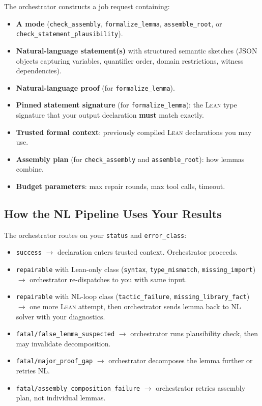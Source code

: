 \documentclass[11pt,a4paper]{article}
\newcommand{\Lean}{\textsc{Lean}}
\begin{document}
The orchestrator constructs a job request containing:

\begin{itemize}[leftmargin=2em]
  \item \textbf{A mode} (\texttt{check\_assembly}, \texttt{formalize\_lemma}, \texttt{assemble\_root}, or \texttt{check\_statement\_plausibility}).
  \item \textbf{Natural-language statement(s)} with structured semantic sketches (JSON objects capturing variables, quantifier order, domain restrictions, witness dependencies).
  \item \textbf{Natural-language proof} (for \texttt{formalize\_lemma}).
  \item \textbf{Pinned statement signature} (for \texttt{formalize\_lemma}): the \Lean{} type signature that your output declaration \textbf{must} match exactly.
  \item \textbf{Trusted formal context}: previously compiled \Lean{} declarations you may use.
  \item \textbf{Assembly plan} (for \texttt{check\_assembly} and \texttt{assemble\_root}): how lemmas combine.
  \item \textbf{Budget parameters}: max repair rounds, max tool calls, timeout.
\end{itemize}

\subsection{How the NL Pipeline Uses Your Results}

The orchestrator routes on your \texttt{status} and \texttt{error\_class}:

\begin{itemize}[leftmargin=2em]
  \item \texttt{success} $\to$ declaration enters trusted context. Orchestrator proceeds.
  \item \texttt{repairable} with Lean-only class (\texttt{syntax}, \texttt{type\_mismatch}, \texttt{missing\_import}) $\to$ orchestrator re-dispatches to you with same input.
  \item \texttt{repairable} with NL-loop class (\texttt{tactic\_failure}, \texttt{missing\_library\_fact}) $\to$ one more \Lean{} attempt, then orchestrator sends lemma back to NL solver with your diagnostics.
  \item \texttt{fatal/false\_lemma\_suspected} $\to$ orchestrator runs plausibility check, then may invalidate decomposition.
  \item \texttt{fatal/major\_proof\_gap} $\to$ orchestrator decomposes the lemma further or retries NL.
  \item \texttt{fatal/assembly\_composition\_failure} $\to$ orchestrator retries assembly plan, not individual lemmas.
\end{itemize}
\end{document}
